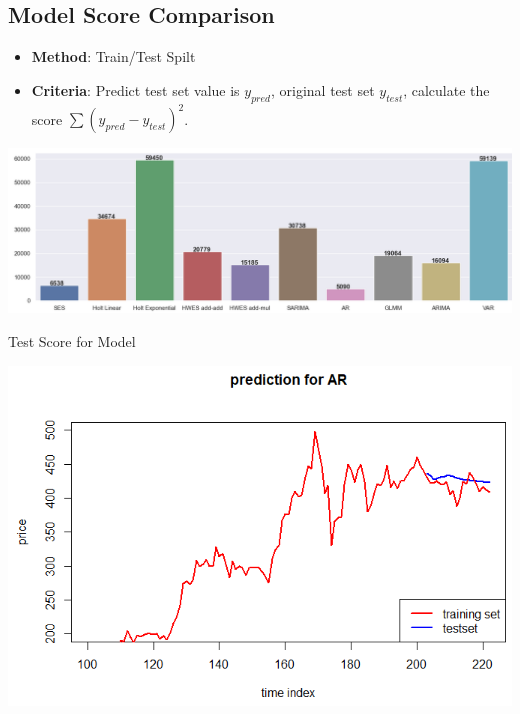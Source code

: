 \documentclass[a0,portrait]{a0poster}
\begin{document}
\begin{multicols}{3}
\subsection*{Model Score Comparison}
\begin{itemize}
    \item \textbf{Method}: Train/Test Spilt
    \item \textbf{Criteria}: Predict test set value is $y_{pred}$, original test set $y_{test}$, calculate the score $\sum (y_{pred} - y_{test})^2$. 
\end{itemize}

\begin{center}
\includegraphics[width=1.0\linewidth]{score.png}
\caption{Test Score for Model}
\end{center}\vspace{1cm}
\begin{center}
\includegraphics[width=1.0\linewidth]{AR.png}
\end{center}\vspace{1cm}


\end{multicols}
\end{document}
